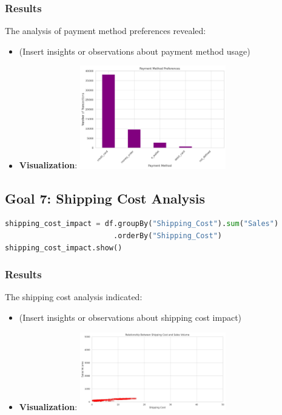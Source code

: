 \documentclass{article}
\begin{document}
\subsubsection{Results}
The analysis of payment method preferences revealed:

\begin{itemize}
    \item (Insert insights or observations about payment method usage)
     \item \textbf{Visualization}: \includegraphics[width=0.5\textwidth]{goal6.jpeg}
\end{itemize}

\subsection{Goal 7: Shipping Cost Analysis}
\begin{lstlisting}[language=Python, caption={Shipping cost impact analysis}]
shipping_cost_impact = df.groupBy("Shipping_Cost").sum("Sales")
                         .orderBy("Shipping_Cost")
shipping_cost_impact.show()
\end{lstlisting}
\subsubsection{Results}
The shipping cost analysis indicated:

\begin{itemize}
    \item (Insert insights or observations about shipping cost impact)
    \item \textbf{Visualization}: \includegraphics[width=0.5\textwidth]{goal7.jpeg}
\end{itemize}
\end{document}
